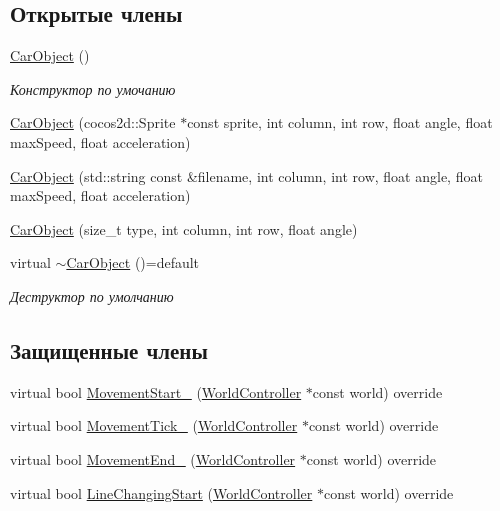 \subsection*{Открытые члены}
\begin{DoxyCompactItemize}
\item 
\mbox{\label{classrtm_1_1_car_object_a7cc3a1d53d77c6b68e9b915455d41532}} 
\hyperlink{classrtm_1_1_car_object_a7cc3a1d53d77c6b68e9b915455d41532}{Car\+Object} ()
\begin{DoxyCompactList}\small\item\em Конструктор по умочанию \end{DoxyCompactList}\item 
\hyperlink{classrtm_1_1_car_object_af260c7e577da1e4dd75d11ae73deb1e2}{Car\+Object} (cocos2d\+::\+Sprite $\ast$const sprite, int column, int row, float angle, float max\+Speed, float acceleration)
\item 
\hyperlink{classrtm_1_1_car_object_a1f376fdc4f75df46cefc98051b05be4b}{Car\+Object} (std\+::string const \&filename, int column, int row, float angle, float max\+Speed, float acceleration)
\item 
\hyperlink{classrtm_1_1_car_object_a9f40742f9e1deb7746c9207205be73b4}{Car\+Object} (size\+\_\+t type, int column, int row, float angle)
\item 
\mbox{\label{classrtm_1_1_car_object_a6af110bb8064a0b32ffe97a72e3645cf}} 
virtual \hyperlink{classrtm_1_1_car_object_a6af110bb8064a0b32ffe97a72e3645cf}{$\sim$\+Car\+Object} ()=default
\begin{DoxyCompactList}\small\item\em Деструктор по умолчанию \end{DoxyCompactList}\end{DoxyCompactItemize}
\subsection*{Защищенные члены}
\begin{DoxyCompactItemize}
\item 
virtual bool \hyperlink{classrtm_1_1_car_object_abbedfee1e8db8b12ea912d77efc4805c}{Movement\+Start\+\_\+} (\hyperlink{classrtm_1_1_world_controller}{World\+Controller} $\ast$const world) override
\item 
virtual bool \hyperlink{classrtm_1_1_car_object_abe89fea4893e244d9f6fb17c596b5ae0}{Movement\+Tick\+\_\+} (\hyperlink{classrtm_1_1_world_controller}{World\+Controller} $\ast$const world) override
\item 
virtual bool \hyperlink{classrtm_1_1_car_object_a24354013f953386699bbb3f4464adb0c}{Movement\+End\+\_\+} (\hyperlink{classrtm_1_1_world_controller}{World\+Controller} $\ast$const world) override
\item 
virtual bool \hyperlink{classrtm_1_1_car_object_a34063664a03d36d1308c80e064d1ae61}{Line\+Changing\+Start} (\hyperlink{classrtm_1_1_world_controller}{World\+Controller} $\ast$const world) override
\end{DoxyCompactItemize}
